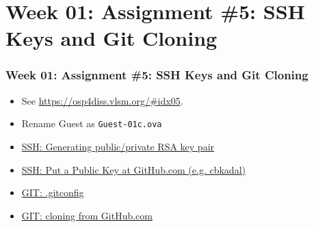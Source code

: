\documentclass[xcolor=table, notheorems, hyperref={pdfpagelabels=false}]{beamer}
\begin{document}
\section{Week 01: Assignment \#5: SSH Keys and Git Cloning}
\begin{frame}[fragile]
\frametitle{Week 01: Assignment \#5: SSH Keys and Git Cloning}
\begin{itemize}
\item See \url{https://osp4diss.vlsm.org/\#idx05}.
\item Rename Guest as \texttt{Guest-01c.ova}
\item \href{https://osp4diss.vlsm.org/osp-110.html}{SSH: Generating public/private RSA key pair}
\item \href{https://osp4diss.vlsm.org/osp-111.html}{SSH: Put a Public Key at GitHub.com (e.g. cbkadal)}
\item \href{https://osp4diss.vlsm.org/osp-112.html}{GIT: .gitconfig}
\item \href{https://osp4diss.vlsm.org/osp-113.html}{GIT: cloning from GitHub.com}
\end{itemize}
\end{frame}


\end{document}
